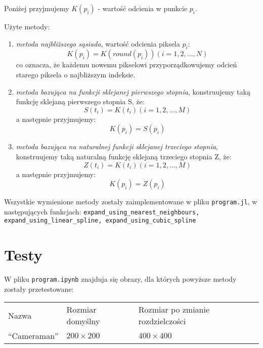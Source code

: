 \documentclass[a4paper,10pt]{article}
\begin{document}
  \newpage
  Poniżej przyjmujemy $K(p_i)$ - wartość odcienia
  w punkcie $p_i$.
  
  Użyte metody:
  \begin{enumerate}
   \item \textit{metoda najbliższego sąsiada}, wartość odcienia
   piksela $p_i$:
   \[K(p_i) = K(round(p_i)) (i = 1, 2,\dots, N)\]
   co oznacza, że każdemu nowemu pikselowi przyporządkowujemy
   odcień starego piksela o najbliższym indeksie.
   
   \item \textit{metoda bazująca na funkcji sklejanej pierwszego
   stopnia}, konstruujemy taką funkcję sklejaną pierwszego stopnia
   S, że:
   \[S(t_i) = K(t_i) (i = 1, 2,\dots, M)\]
   a następnie przyjmujemy:
   \[K(p_i) = S(p_i)\]
   
   \item \textit{metoda bazująca na naturalnej funkcji sklejanej
   trzeciego stopnia}, konstruujemy taką naturalną funkcję sklejaną
   trzeciego stopnia Z, że:
   \[Z(t_i) = K(t_i) (i = 1, 2,\dots, M)\]
   a następnie przyjmujemy:
   \[K(p_i) = Z(p_i)\]
  \end{enumerate}
  
  Wszystkie wymienione metody zostały zaimplementowane w pliku
  \texttt{program.jl}, w następujących funkcjach: 
  \texttt{expand\_using\_nearest\_neighbours, 
  expand\_using\_linear\_spline,
  expand\_using\_cubic\_spline}\\
  
  \section{Testy}
  
  W pliku \texttt{program.ipynb} znajduja się obrazy, dla których
  powyższe metody zostały przetestowane:
  
  \begin{center}
   \begin{tabular}{| l | l | l |}
    \hline
     Nazwa                                          &  Rozmiar domyślny  &  Rozmiar po zmianie rozdzielczości\\
     \textquotedblleft Cameraman\textquotedblright  &  $200\times 200$   &  $400\times 400$\\ 
     \hline
    \end{tabular}
   \end{center}
\end{document}
